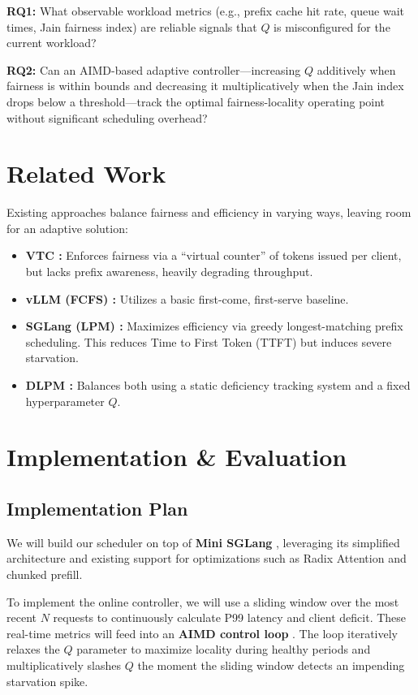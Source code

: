 \documentclass{article}
\begin{document}
\textbf{RQ1:} What observable workload metrics (e.g., prefix cache hit rate, queue wait times, Jain fairness index) are reliable signals that $Q$ is misconfigured for the current workload?

\textbf{RQ2:} Can an AIMD-based adaptive controller---increasing $Q$ additively when fairness is within bounds and decreasing it multiplicatively when the Jain index drops below a threshold---track the optimal fairness-locality operating point without significant scheduling overhead?

\section{Related Work}
Existing approaches balance fairness and efficiency in varying ways, leaving room for an adaptive solution:
\begin{itemize}
    \item \textbf{VTC \cite{VTC}:} Enforces fairness via a ``virtual counter'' of tokens issued per client, but lacks prefix awareness, heavily degrading throughput.
    \item \textbf{vLLM (FCFS) \cite{vllm_fcfs}:} Utilizes a basic first-come, first-serve baseline.
    \item \textbf{SGLang (LPM) \cite{sglang}:} Maximizes efficiency via greedy longest-matching prefix scheduling. This reduces Time to First Token (TTFT) but induces severe starvation.
    \item \textbf{DLPM \cite{locality_aware_fair_scheduling_llm}:} Balances both using a static deficiency tracking system and a fixed hyperparameter $Q$.
\end{itemize}

\section{Implementation \& Evaluation}

\subsection{Implementation Plan}
We will build our scheduler on top of \textbf{Mini SGLang} \cite{MiniSGLang}, leveraging its simplified architecture and existing support for optimizations such as Radix Attention and chunked prefill. 

To implement the online controller, we will use a sliding window over the most recent $N$ requests to continuously calculate P99 latency and client deficit. These real-time metrics will feed into an \textbf{AIMD control loop} \cite{crankshaw2017clipperlowlatencyonlineprediction}. The loop iteratively relaxes the $Q$ parameter to maximize locality during healthy periods and multiplicatively slashes $Q$ the moment the sliding window detects an impending starvation spike.
\end{document}
